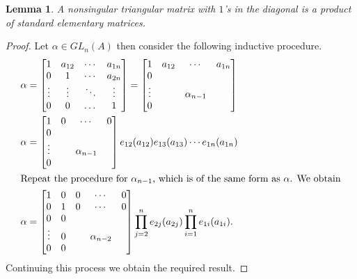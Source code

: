\documentclass[12pt]{report}
\numberwithin{equation}{section}
\newcounter{dummy} \numberwithin{dummy}{section}
\newtheorem{lemma}[dummy]{Lemma}
\begin{document}
	\begin{lemma}\label{diag1andprodelementary}
		A nonsingular triangular matrix with $1$'s in the diagonal is a product of standard elementary matrices.
	\end{lemma}
	\begin{proof}
		Let $\alpha \in GL_n(A)$ then consider the following inductive procedure.
		\begin{align*}
			\alpha&= \begin{bmatrix}
				1 & a_{12} &\cdots &a_{1n}\\
				0& 1 & \cdots &a_{2n}\\
				\vdots & \vdots  & \ddots  & \vdots \\
				0 & 0 & \dots & 1
			\end{bmatrix}
			= \begin{bmatrix}
				1 & a_{12} &\cdots &a_{1n}\\
				0&  &   &\\
				\vdots &  & \alpha_{n-1}  &  \\
				0 &  & & 
			\end{bmatrix}\\
			\alpha&=\begin{bmatrix}
				1 & 0 &\cdots &0\\
				0&  &   &\\
				\vdots &  & \alpha_{n-1}  &  \\
				0 &  & & 
			\end{bmatrix} e_{12}(a_{12}) e_{13}(a_{13}) \cdots e_{1n}(a_{1n})\\
			\intertext{Repeat the procedure for $\alpha_{n-1}$, which is of the same form as $\alpha$. We obtain}
			\alpha&= \begin{bmatrix}
				1 & 0 & 0 & \cdots & 0 \\
				0 & 1 & 0 & \cdots & 0\\
				0 & 0 &   &  &\\
				\vdots & 0 &   &\alpha_{n-2}  &\\
				0 & 0 &   &  &
			\end{bmatrix}\prod_{j=2}^n e_{2j}(a_{2j}) \prod_{i=1}^n e_{1i} (a_{1i}).
		\end{align*}
		Continuing this process we obtain the required result.
	\end{proof}
	
\end{document}
